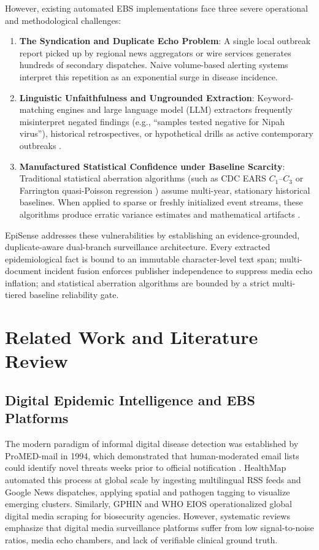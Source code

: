 \documentclass[conference]{IEEEtran}
\begin{document}
However, existing automated EBS implementations face three severe operational and methodological challenges:
\begin{enumerate}
    \item \textbf{The Syndication and Duplicate Echo Problem}: A single local outbreak report picked up by regional news aggregators or wire services generates hundreds of secondary dispatches. Naive volume-based alerting systems interpret this repetition as an exponential surge in disease incidence.
    \item \textbf{Linguistic Unfaithfulness and Ungrounded Extraction}: Keyword-matching engines and large language model (LLM) extractors frequently misinterpret negated findings (e.g., ``samples tested negative for Nipah virus''), historical retrospectives, or hypothetical drills as active contemporary outbreaks \cite{Chapman2001,Ji2023}.
    \item \textbf{Manufactured Statistical Confidence under Baseline Scarcity}: Traditional statistical aberration algorithms (such as CDC EARS $C_1$--$C_3$ \cite{Hutwagner2003} or Farrington quasi-Poisson regression \cite{Farrington1996,Noufaily2013}) assume multi-year, stationary historical baselines. When applied to sparse or freshly initialized event streams, these algorithms produce erratic variance estimates and mathematical artifacts \cite{Unkel2012}.
\end{enumerate}

EpiSense addresses these vulnerabilities by establishing an evidence-grounded, duplicate-aware dual-branch surveillance architecture. Every extracted epidemiological fact is bound to an immutable character-level text span; multi-document incident fusion enforces publisher independence to suppress media echo inflation; and statistical aberration algorithms are bounded by a strict multi-tiered baseline reliability gate.

\section{Related Work and Literature Review}
\subsection{Digital Epidemic Intelligence and EBS Platforms}
The modern paradigm of informal digital disease detection was established by ProMED-mail in 1994, which demonstrated that human-moderated email lists could identify novel threats weeks prior to official notification \cite{Madoff2005,Carrion2017}. HealthMap \cite{Brownstein2008,Freifeld2008} automated this process at global scale by ingesting multilingual RSS feeds and Google News dispatches, applying spatial and pathogen tagging to visualize emerging clusters. Similarly, GPHIN \cite{Mawudeku2013} and WHO EIOS \cite{WHO2020} operationalized global digital media scraping for biosecurity agencies. However, systematic reviews \cite{Velasco2014,Hartley2013,Leal2020} emphasize that digital media surveillance platforms suffer from low signal-to-noise ratios, media echo chambers, and lack of verifiable clinical ground truth.
\end{document}
